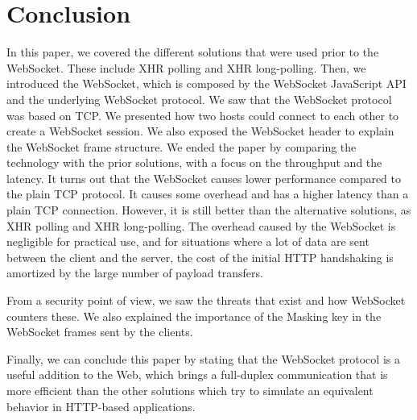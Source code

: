 \documentclass[10pt,journal,compsoc]{IEEEtran}
\newcommand{\ws}{WebSocket}
\begin{document}
\section{Conclusion}
In this paper, we covered the different solutions that were used prior to the \ws{}.
These include XHR polling and XHR long-polling.
Then, we introduced the \ws{}, which is composed by the \ws{} JavaScript API and the underlying \ws{} protocol.
We saw that the \ws{} protocol was based on TCP.
We presented how two hosts could connect to each other to create a \ws{} session.
We also exposed the \ws{} header to explain the \ws{} frame structure.
We ended the paper by comparing the technology with the prior solutions, with a focus on the throughput and the latency.
It turns out that the \ws{} causes lower performance compared to the plain TCP protocol.
It causes some overhead and has a higher latency than a plain TCP connection.
However, it is still better than the alternative solutions, as XHR polling and XHR long-polling.
The overhead caused by the \ws{} is negligible for practical use, and for situations where a lot of data are sent between the client and the server, the cost of the initial HTTP handshaking is amortized by the large number of payload transfers.

From a security point of view, we saw the threats that exist and how \ws{} counters these.
We also explained the importance of the Masking key in the \ws{} frames sent by the clients.

Finally, we can conclude this paper by stating that the \ws{} protocol is a useful addition to the Web, which brings a full-duplex communication that is more efficient than the other solutions which try to simulate an equivalent behavior in HTTP-based applications.

\ifCLASSOPTIONcaptionsoff
  \newpage
\fi




\end{document}
